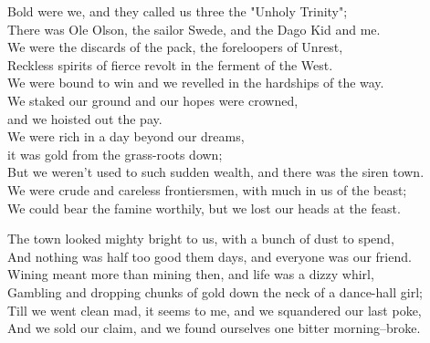 \begin{poemblock}
Bold were we, and they called us three the "Unholy Trinity";\\
There was Ole Olson, the sailor Swede, and the Dago Kid and me.\\
We were the discards of the pack, the foreloopers of Unrest,\\
Reckless spirits of fierce revolt in the ferment of the West.\\
We were bound to win and we revelled in the hardships of the way.\\
We staked our ground and our hopes were crowned,\\
\idt and we hoisted out the pay.\\
We were rich in a day beyond our dreams,\\
\idt it was gold from the grass-roots down;\\
But we weren't used to such sudden wealth, and there was the siren town.\\
We were crude and careless frontiersmen, with much in us of the beast;\\
We could bear the famine worthily, but we lost our heads at the feast.

The town looked mighty bright to us, with a bunch of dust to spend,\\
And nothing was half too good them days, and everyone was our friend.\\
Wining meant more than mining then, and life was a dizzy whirl,\\
Gambling and dropping chunks of gold down the neck of a dance-hall girl;\\
Till we went clean mad, it seems to me, and we squandered our last poke,\\
And we sold our claim, and we found ourselves one bitter morning--broke.


\end{poemblock}
